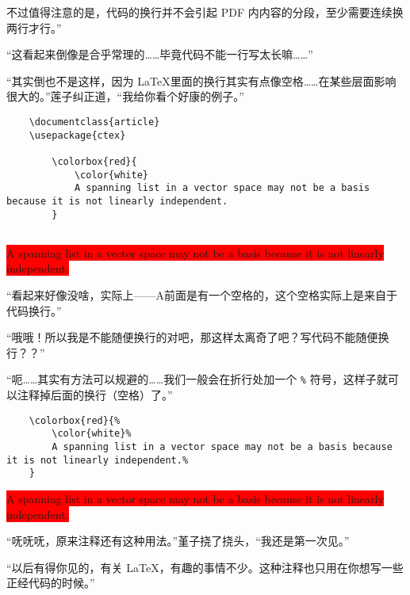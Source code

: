 不过值得注意的是，代码的换行并不会引起 PDF 内内容的分段，至少需要连续换两行才行。”

“这看起来倒像是合乎常理的……毕竟代码不能一行写太长嘛……”

“其实倒也不是这样，因为 \LaTeX 里面的换行其实有点像空格……在某些层面影响很大的。”莲子纠正道，“我给你看个好康的例子。”

\begin{codeing}
    \begin{lstlisting}
    \documentclass{article}
    \usepackage{ctex}
    
        \colorbox{red}{
            \color{white} 
            A spanning list in a vector space may not be a basis because it is not linearly independent.
        }
    
\end{lstlisting}
\end{codeing}

\begin{center}\footnotesize
    \colorbox{red}{
        \color{white}
        A spanning list in a vector space may not be a basis because it is not linearly independent.
    }
\end{center}

“看起来好像没啥，实际上——A前面是有一个空格的，这个空格实际上是来自于代码换行。”

“哦哦！所以我是不能随便换行的对吧，那这样太离奇了吧？写代码不能随便换行？？”

“呃……其实有方法可以规避的……我们一般会在折行处加一个 \verb"%" 符号，这样子就可以注释掉后面的换行（空格）了。”

\begin{codeing}
    \begin{lstlisting}
    \colorbox{red}{%
        \color{white}%
        A spanning list in a vector space may not be a basis because it is not linearly independent.%
    }
\end{lstlisting}
\end{codeing}

\begin{center}\footnotesize
    \colorbox{red}{%
        \color{white}%
        A spanning list in a vector space may not be a basis because it is not linearly independent.%
    }
\end{center}

“呒呒呒，原来注释还有这种用法。”堇子挠了挠头，“我还是第一次见。”

“以后有得你见的，有关 \LaTeX，有趣的事情不少。这种注释也只用在你想写一些正经代码的时候。”

